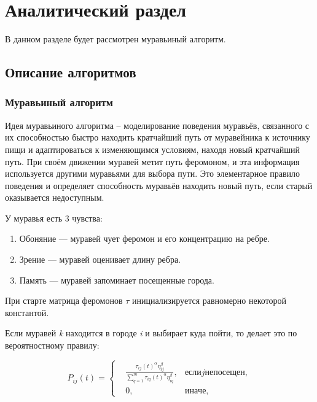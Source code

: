 \documentclass[a4paper,12pt]{article}
\begin{document}
\section{Аналитический раздел}

В данном разделе будет рассмотрен муравьиный алгоритм.

\subsection{Описание алгоритмов}

\subsubsection{Муравьиный алгоритм}

Идея муравьиного алгоритма – моделирование поведения муравьёв, связанного с их способностью быстро
находить кратчайший путь от муравейника к источнику пищи и адаптироваться к изменяющимся условиям,
находя новый кратчайший путь. При своём движении муравей метит путь феромоном, и эта информация
используется другими муравьями для выбора пути. Это элементарное правило поведения и определяет
способность муравьёв находить новый путь, если старый оказывается недоступным.
~\cite{stovba}

У муравья есть 3 чувства: 

\begin{enumerate}
	\item Обоняние --- муравей чует феромон и его концентрацию на ребре. 
	\item Зрение --- муравей оценивает длину ребра. 
	\item Память --- муравей запоминает посещенные города.  
\end{enumerate}

При старте матрица феромонов $\tau$ инициализируется равномерно некоторой константой. 

Если муравей \textit{k} находится в городе \textit{i} и выбирает куда пойти, то делает это по вероятностному правилу: 

\begin{equation}
P_{ij}(t) =  \left\{
\begin{aligned}
&\frac{{\tau_{ij}(t)}^{\alpha} \eta_{ij}^{\beta}}{\sum_{q=1}^m {\tau_{iq}(t)}^{\alpha} \eta_{iq}^{\beta}}, &если j не посещен,\\
&0, &иначе,
\end{aligned}
\right.
\label{p0}
\end{equation}
\end{document}
